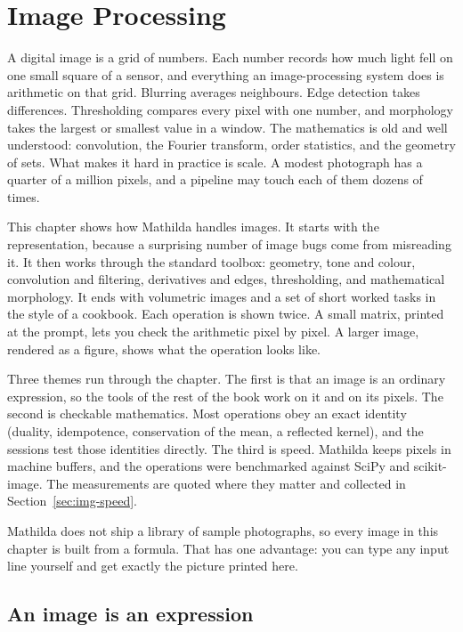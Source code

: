 \chapter{Image Processing}
\label{ch:images}

A digital image is a grid of numbers. Each number records how much light fell on
one small square of a sensor, and everything an image-processing system does is
arithmetic on that grid. Blurring averages neighbours. Edge detection takes
differences. Thresholding compares every pixel with one number, and morphology
takes the largest or smallest value in a window. The mathematics is old and well
understood: convolution, the Fourier transform, order statistics, and the
geometry of sets. What makes it hard in practice is scale. A modest photograph
has a quarter of a million pixels, and a pipeline may touch each of them dozens
of times.

This chapter shows how Mathilda handles images. It starts with the
representation, because a surprising number of image bugs come from misreading
it. It then works through the standard toolbox: geometry, tone and colour,
convolution and filtering, derivatives and edges, thresholding, and mathematical
morphology. It ends with volumetric images and a set of short worked tasks in the
style of a cookbook. Each operation is shown twice. A small matrix, printed at
the prompt, lets you check the arithmetic pixel by pixel. A larger image, rendered
as a figure, shows what the operation looks like.

Three themes run through the chapter. The first is that an image is an
ordinary expression, so the tools of the rest of the book work on it and on its
pixels. The second is checkable mathematics. Most operations obey an exact
identity (duality, idempotence, conservation of the mean, a reflected kernel),
and the sessions test those identities directly. The third is speed. Mathilda
keeps pixels in machine buffers, and the operations were benchmarked against
SciPy and scikit-image. The measurements are quoted where they matter and
collected in Section~\ref{sec:img-speed}.

Mathilda does not ship a library of sample photographs, so every image in this
chapter is built from a formula. That has one advantage: you can type any input
line yourself and get exactly the picture printed here.

\section{An image is an expression}
\label{sec:img-expr}

